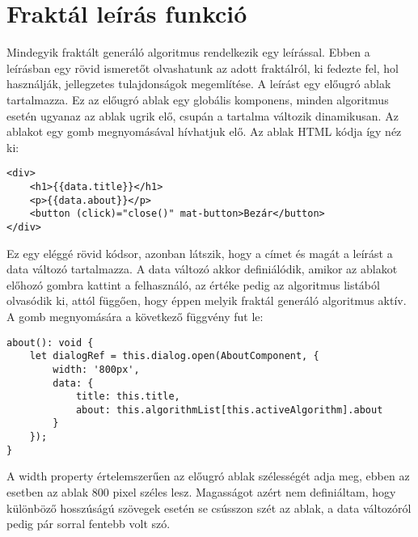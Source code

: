 \section*{Fraktál leírás funkció}
Mindegyik fraktált generáló algoritmus rendelkezik egy leírással. Ebben a leírásban egy rövid ismeretőt olvashatunk az adott fraktálról, ki fedezte fel, hol használják, jellegzetes tulajdonságok megemlítése. A leírást egy előugró ablak tartalmazza. Ez az előugró ablak egy globális komponens, minden algoritmus esetén ugyanaz az ablak ugrik elő, csupán a tartalma változik dinamikusan. Az ablakot egy gomb megnyomásával hívhatjuk elő. Az ablak HTML kódja így néz ki:
\begin{lstlisting}
<div>
	<h1>{{data.title}}</h1>
	<p>{{data.about}}</p>
	<button (click)="close()" mat-button>Bezár</button>
</div>
\end{lstlisting}
Ez egy eléggé rövid kódsor, azonban látszik, hogy a címet és magát a leírást a data változó tartalmazza. A data változó akkor definiálódik, amikor az ablakot előhozó gombra kattint a felhasználó, az értéke pedig az algoritmus listából olvasódik ki, attól függően, hogy éppen melyik fraktál generáló algoritmus aktív. A gomb megnyomására a következő függvény fut le:
\begin{lstlisting}
about(): void {
	let dialogRef = this.dialog.open(AboutComponent, {
		width: '800px',
		data: {
			title: this.title,
			about: this.algorithmList[this.activeAlgorithm].about
		}
	});
}
\end{lstlisting}
A width property értelemszerűen az előugró ablak szélességét adja meg, ebben az esetben az ablak 800 pixel széles lesz. Magasságot azért nem definiáltam, hogy különböző hosszúságú szövegek esetén se csússzon szét az ablak, a data változóról pedig pár sorral fentebb volt szó.